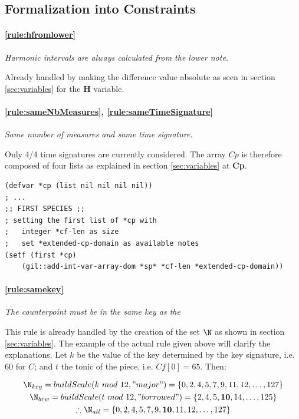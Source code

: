 \subsection{Formalization into Constraints}

\paragraph{\ref{rule:hfromlower}} \textit{Harmonic intervals are always calculated from the lower note.}

Already handled by making the difference value absolute as seen in section \ref{sec:variables} for the \textbf{H} variable. 

\paragraph{\ref{rule:sameNbMeasures}, \ref{rule:sameTimeSignature}} \textit{Same number of measures and same time signature.}

Only 4/4 time signatures are currently considered. The array $Cp$ is therefore composed of four lists as explained in section \ref{sec:variables} at \textbf{Cp}.

\begin{lstlisting}[caption=Definition of $Cp$ in the first species., label=lst:defcp, basicstyle=\ttfamily\small]
(defvar *cp (list nil nil nil nil))
; ...
;; FIRST SPECIES ;;
; setting the first list of *cp with
;   integer *cf-len as size
;   set *extended-cp-domain as available notes
(setf (first *cp)
    (gil::add-int-var-array-dom *sp* *cf-len *extended-cp-domain))
\end{lstlisting}

\paragraph{\ref{rule:samekey}} \textit{The counterpoint must be in the same key as the \cfdot}

This rule is already handled by the creation of the set $\N$ as shown in section \ref{sec:variables}. The example of the actual rule given above will clarify the explanations. Let $k$ be the value of the key determined by the key signature, i.e. $60$ for $C$; and $t$ the tonic of the piece, i.e. $Cf[0]=65$. Then:

\begin{equation*}
    \begin{gathered}
        \N_{key} = buildScale(k\ mod\ 12, "major") = \{0, 2, 4, 5, 7, 9, 11, 12, \dots, 127\}\\
        \N_{brw} = buildScale(t\ mod\ 12, "borrowed") = \{2, 4, 5, \textbf{10}, 14, \dots, 125\}\\
        \therefore \N_{all}=\{0, 2, 4, 5, 7, 9, \textbf{10}, 11, 12, \dots, 127\}
    \end{gathered}
\end{equation*}

